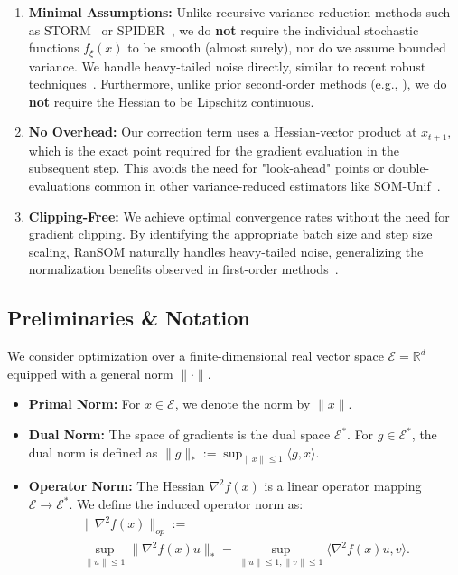 \documentclass{article}
\theoremstyle{plain}
\theoremstyle{definition}
\theoremstyle{remark}
\newcommand{\R}{\mathbb{R}}
\begin{document}
\begin{enumerate}
    \item \textbf{Minimal Assumptions:} Unlike recursive variance reduction methods such as STORM~\cite{cutkosky2019storm} or SPIDER~\cite{fang2018spider}, we do \textbf{not} require the individual stochastic functions $f_\xi(x)$ to be smooth (almost surely), nor do we assume bounded variance. We handle heavy-tailed noise directly, similar to recent robust techniques~\cite{liu2023nonconvex, hubler2025gradient}. Furthermore, unlike prior second-order methods (e.g., \cite{tran2022better, khirirat2025better}), we do \textbf{not} require the Hessian to be Lipschitz continuous.
    
    \item \textbf{No Overhead:} Our correction term uses a Hessian-vector product at $x_{t+1}$, which is the exact point required for the gradient evaluation in the subsequent step. This avoids the need for "look-ahead" points or double-evaluations common in other variance-reduced estimators like SOM-Unif~\cite{salehkaleybar2022momentum, zhang2020one}.
    
    \item \textbf{Clipping-Free:} We achieve optimal convergence rates without the need for gradient clipping. By identifying the appropriate batch size and step size scaling, RanSOM naturally handles heavy-tailed noise, generalizing the normalization benefits observed in first-order methods~\cite{hubler2025gradient}.
\end{enumerate}

\subsection{Preliminaries \& Notation}

We consider optimization over a finite-dimensional real vector space $\mathcal{E} = \R^d$ equipped with a general norm $\|\cdot\|$.
\begin{itemize}
    \item \textbf{Primal Norm:} For $x \in \mathcal{E}$, we denote the norm by $\|x\|$.
    \item \textbf{Dual Norm:} The space of gradients is the dual space $\mathcal{E}^*$. For $g \in \mathcal{E}^*$, the dual norm is defined as $\|g\|_* := \sup_{\|x\| \le 1} \langle g, x \rangle$.
    \item \textbf{Operator Norm:} The Hessian $\nabla^2 f(x)$ is a linear operator mapping $\mathcal{E} \to \mathcal{E}^*$. We define the induced operator norm as:
    \begin{multline*}
        \|\nabla^2 f(x)\|_{op} :=\\ \sup_{\|u\| \le 1} \|\nabla^2 f(x) u\|_* = \sup_{\|u\| \le 1, \|v\| \le 1} \langle \nabla^2 f(x) u, v \rangle.
    \end{multline*}
\end{itemize}
\end{document}
